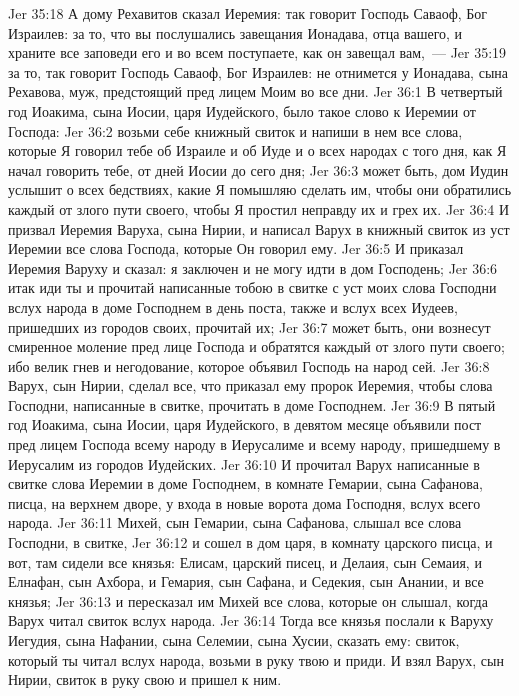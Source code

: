 \vs Jer 35:18 А дому Рехавитов сказал Иеремия: так говорит Господь Саваоф, Бог Израилев: за то, что вы послушались завещания Ионадава, отца вашего, и храните все заповеди его и во всем поступаете, как он завещал вам,~---
\vs Jer 35:19 за то, так говорит Господь Саваоф, Бог Израилев: не отнимется у Ионадава, сына Рехавова, муж, предстоящий пред лицем Моим во все дни.
\vs Jer 36:1 В четвертый год Иоакима, сына Иосии, царя Иудейского, было такое слово к Иеремии от Господа:
\vs Jer 36:2 возьми себе книжный свиток и напиши в нем все слова, которые Я говорил тебе об Израиле и об Иуде и о всех народах с того дня, как Я начал говорить тебе, от дней Иосии до сего дня;
\vs Jer 36:3 может быть, дом Иудин услышит о всех бедствиях, какие Я помышляю сделать им, чтобы они обратились каждый от злого пути своего, чтобы Я простил неправду их и грех их.
\vs Jer 36:4 И призвал Иеремия Варуха, сына Нирии, и написал Варух в книжный свиток из уст Иеремии все слова Господа, которые Он говорил ему.
\vs Jer 36:5 И приказал Иеремия Варуху и сказал: я заключен и не могу идти в дом Господень;
\vs Jer 36:6 итак иди ты и прочитай написанные тобою в свитке с уст моих слова Господни вслух народа в доме Господнем в день поста, также и вслух всех Иудеев, пришедших из городов своих, прочитай их;
\vs Jer 36:7 может быть, они вознесут смиренное моление пред лице Господа и обратятся каждый от злого пути своего; ибо велик гнев и негодование, которое объявил Господь на народ сей.
\vs Jer 36:8 Варух, сын Нирии, сделал все, что приказал ему пророк Иеремия, чтобы слова Господни, написанные в свитке, прочитать в доме Господнем.
\rsbpar\vs Jer 36:9 В пятый год Иоакима, сына Иосии, царя Иудейского, в девятом месяце объявили пост пред лицем Господа всему народу в Иерусалиме и всему народу, пришедшему в Иерусалим из городов Иудейских.
\vs Jer 36:10 И прочитал Варух написанные в свитке слова Иеремии в доме Господнем, в комнате Гемарии, сына Сафанова, писца, на верхнем дворе, у входа в новые ворота дома Господня, вслух всего народа.
\vs Jer 36:11 Михей, сын Гемарии, сына Сафанова, слышал все слова Господни,  в свитке,
\vs Jer 36:12 и сошел в дом царя, в комнату царского писца, и вот, там сидели все князья: Елисам, царский писец, и Делаия, сын Семаия, и Елнафан, сын Ахбора, и Гемария, сын Сафана, и Седекия, сын Анании, и все князья;
\vs Jer 36:13 и пересказал им Михей все слова, которые он слышал, когда Варух читал свиток вслух народа.
\vs Jer 36:14 Тогда все князья послали к Варуху Иегудия, сына Нафании, сына Селемии, сына Хусии, сказать ему: свиток, который ты читал вслух народа, возьми в руку твою и приди. И взял Варух, сын Нирии, свиток в руку свою и пришел к ним.
